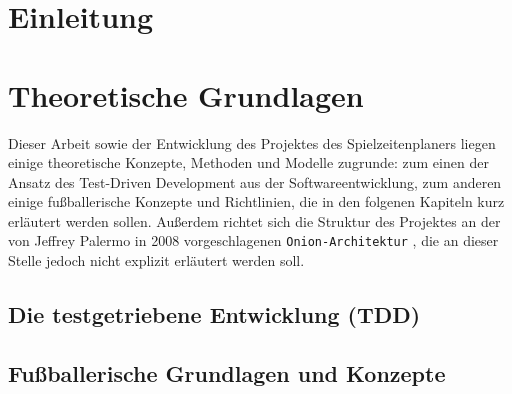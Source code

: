 %
%





\section{Einleitung}




\section{Theoretische Grundlagen}

Dieser Arbeit sowie der Entwicklung des Projektes des Spielzeitenplaners liegen 
einige theoretische Konzepte, Methoden und Modelle zugrunde: zum einen der Ansatz des 
Test-Driven Development aus der Softwareentwicklung, zum anderen einige fußballerische 
Konzepte und Richtlinien, die in den folgenen Kapiteln kurz erläutert werden sollen. 
Außerdem richtet sich die Struktur des Projektes an der von Jeffrey Palermo in 2008 
vorgeschlagenen \texttt{Onion-Architektur} \cite{palermo2008onion}, die an dieser 
Stelle jedoch nicht explizit erläutert werden soll. 


\subsection{Die testgetriebene Entwicklung (TDD)}




\subsection{Fußballerische Grundlagen und Konzepte}

